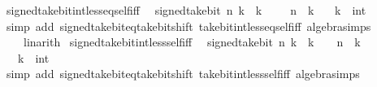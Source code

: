 \begin{isabellebody}
\endisatagproof
{\isafoldproof}%
%
\isadelimproof
\isanewline
%
\endisadelimproof
\isanewline
{}\isamarkupfalse%
\ signed{\isacharunderscore}{\kern0pt}take{\isacharunderscore}{\kern0pt}bit{\isacharunderscore}{\kern0pt}int{\isacharunderscore}{\kern0pt}less{\isacharunderscore}{\kern0pt}eq{\isacharunderscore}{\kern0pt}self{\isacharunderscore}{\kern0pt}iff{\isacharcolon}{\kern0pt}\isanewline
\ \ {\isacartoucheopen}signed{\isacharunderscore}{\kern0pt}take{\isacharunderscore}{\kern0pt}bit\ n\ k\ {\isasymle}\ k\ {\isasymlongleftrightarrow}\ {\isacharminus}{\kern0pt}\ {\isacharparenleft}{\kern0pt}{}\ {\isacharcircum}{\kern0pt}\ n{\isacharparenright}{\kern0pt}\ {\isasymle}\ k{\isacartoucheclose}\isanewline
\ \ \ k\ {\isacharcolon}{\kern0pt}{\isacharcolon}{\kern0pt}\ int\isanewline
%
\isadelimproof
\ \ %
\endisadelimproof
%
\isatagproof
{}\isamarkupfalse%
\ {\isacharparenleft}{\kern0pt}simp\ add{\isacharcolon}{\kern0pt}\ signed{\isacharunderscore}{\kern0pt}take{\isacharunderscore}{\kern0pt}bit{\isacharunderscore}{\kern0pt}eq{\isacharunderscore}{\kern0pt}take{\isacharunderscore}{\kern0pt}bit{\isacharunderscore}{\kern0pt}shift\ take{\isacharunderscore}{\kern0pt}bit{\isacharunderscore}{\kern0pt}int{\isacharunderscore}{\kern0pt}less{\isacharunderscore}{\kern0pt}eq{\isacharunderscore}{\kern0pt}self{\isacharunderscore}{\kern0pt}iff\ algebra{\isacharunderscore}{\kern0pt}simps{\isacharparenright}{\kern0pt}\isanewline
\ \ \ \ linarith%
\endisatagproof
{\isafoldproof}%
%
\isadelimproof
\isanewline
%
\endisadelimproof
\isanewline
{}\isamarkupfalse%
\ signed{\isacharunderscore}{\kern0pt}take{\isacharunderscore}{\kern0pt}bit{\isacharunderscore}{\kern0pt}int{\isacharunderscore}{\kern0pt}less{\isacharunderscore}{\kern0pt}self{\isacharunderscore}{\kern0pt}iff{\isacharcolon}{\kern0pt}\isanewline
\ \ {\isacartoucheopen}signed{\isacharunderscore}{\kern0pt}take{\isacharunderscore}{\kern0pt}bit\ n\ k\ {\isacharless}{\kern0pt}\ k\ {\isasymlongleftrightarrow}\ {}\ {\isacharcircum}{\kern0pt}\ n\ {\isasymle}\ k{\isacartoucheclose}\isanewline
\ \ \ k\ {\isacharcolon}{\kern0pt}{\isacharcolon}{\kern0pt}\ int\isanewline
%
\isadelimproof
\ \ %
\endisadelimproof
%
\isatagproof
{}\isamarkupfalse%
\ {\isacharparenleft}{\kern0pt}simp\ add{\isacharcolon}{\kern0pt}\ signed{\isacharunderscore}{\kern0pt}take{\isacharunderscore}{\kern0pt}bit{\isacharunderscore}{\kern0pt}eq{\isacharunderscore}{\kern0pt}take{\isacharunderscore}{\kern0pt}bit{\isacharunderscore}{\kern0pt}shift\ take{\isacharunderscore}{\kern0pt}bit{\isacharunderscore}{\kern0pt}int{\isacharunderscore}{\kern0pt}less{\isacharunderscore}{\kern0pt}self{\isacharunderscore}{\kern0pt}iff\ algebra{\isacharunderscore}{\kern0pt}simps{\isacharparenright}{\kern0pt}%

\end{isabellebody}
